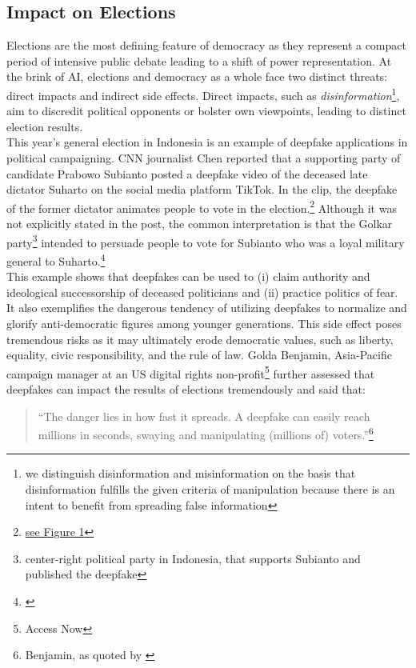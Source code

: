 \documentclass[wide]{adonis}
\begin{document}
        \subsection{Impact on Elections}
        Elections are the most defining feature of democracy as they represent a compact period of intensive public debate leading to a shift of power representation. At the brink of AI, elections and democracy as a whole face two distinct threats: direct impacts and indirect side effects. Direct impacts, such as \textit{disinformation}\footnote{we distinguish disinformation and misinformation on the basis that disinformation fulfills the given criteria of manipulation because there is an intent to benefit from spreading false information}, aim to discredit political opponents or bolster own viewpoints, leading to distinct election results.\\
        This year's general election in Indonesia is an example of deepfake applications in political campaigning. CNN journalist Chen reported that a supporting party of candidate Prabowo Subianto posted a deepfake video of the deceased late dictator Suharto on the social media platform TikTok. In the clip, the deepfake of the former dictator animates people to vote in the election.\footnote{\hyperref[fig1]{see Figure 1}} Although it was not explicitly stated in the post, the common interpretation is that the Golkar party\footnote{center-right political party in Indonesia, that supports Subianto and published the deepfake} intended to persuade people to vote for Subianto who was a loyal military general to Suharto.\footnote{\cite{cnn-indonesia}} \\
        This example shows that deepfakes can be used to (i) claim authority and ideological successorship of deceased politicians and (ii) practice politics of fear. It also exemplifies the dangerous tendency of utilizing deepfakes to normalize and glorify anti-democratic figures among younger generations. This side effect poses tremendous risks as it may ultimately erode democratic values, such as liberty, equality, civic responsibility, and the rule of law. Golda Benjamin, Asia-Pacific campaign manager at an US digital rights non-profit\footnote{Access Now} further assessed that deepfakes can impact the results of elections tremendously and said that:
        \begin{quote}
            “The danger lies in how fast it spreads. A deepfake can easily reach millions in seconds, swaying and manipulating (millions of) voters.”\footnote{Benjamin, as quoted by \cite{cnn-indonesia}}
        \end{quote}
\end{document}
